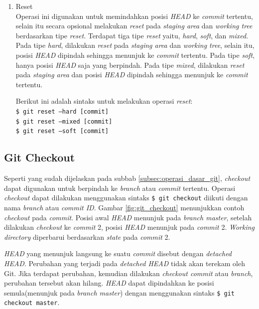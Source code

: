 \begin{enumerate}
\item Reset\\
Operasi ini digunakan untuk memindahkan posisi \textit{HEAD} ke \textit{commit} tertentu, selain itu secara opsional  melakukan \textit{reset} pada \textit{staging area} dan \textit{working tree} berdasarkan tipe \textit{reset}. Terdapat tiga tipe \textit{reset} yaitu, \textit{hard}, \textit{soft}, dan \textit{mixed}. Pada tipe \textit{hard}, dilakukan \textit{reset} pada \textit{staging area} dan \textit{working tree}, selain itu, posisi \textit{HEAD} dipindah sehingga menunjuk ke \textit{commit} tertentu. Pada tipe \textit{soft}, hanya posisi \textit{HEAD} saja yang berpindah. Pada tipe \textit{mixed}, dilakukan \textit{reset} pada \textit{staging area} dan posisi \textit{HEAD} dipindah sehingga menunjuk ke \textit{commit} tertentu.

Berikut ini adalah sintaks untuk melakukan operasi \textit{reset}:\\
\texttt{\$ git reset --hard [commit]}\\
\texttt{\$ git reset --mixed [commit]}\\
\texttt{\$ git reset --soft [commit]}
\end{enumerate}
\subsection{Git Checkout}
\label{subsec:git_checkout}
Seperti yang sudah dijelaskan pada subbab \ref{subsec:operasi_dasar_git}, \textit{checkout} dapat digunakan untuk berpindah ke \textit{branch} atau \textit{commit} tertentu. Operasi \textit{checkout} dapat dilakukan menggunakan sintaks \texttt{\$ git checkout} diikuti dengan nama \textit{branch} atau \textit{commit ID}. Gambar \ref{fig:git_checkout} menunjukkan contoh \textit{checkout} pada \textit{commit}. Posisi awal \textit{HEAD} menunjuk pada \textit{branch master}, setelah dilakukan \textit{checkout} ke \textit{commit} 2, posisi \textit{HEAD} menunjuk pada \textit{commit} 2. \textit{Working directory} diperbarui berdasarkan \textit{state} pada \textit{commit} 2. 

\textit{HEAD} yang menunjuk langsung ke suatu \textit{commit} disebut dengan \textit{detached HEAD}. Perubahan yang terjadi pada \textit{detached HEAD} tidak akan terekam oleh Git. Jika terdapat perubahan, kemudian dilakukan \textit{checkout commit} atau \textit{branch}, perubahan tersebut akan hilang. \textit{HEAD} dapat dipindahkan ke posisi semula(menunjuk pada \textit{branch master}) dengan  menggunakan sintaks \texttt{\$ git checkout master}.


